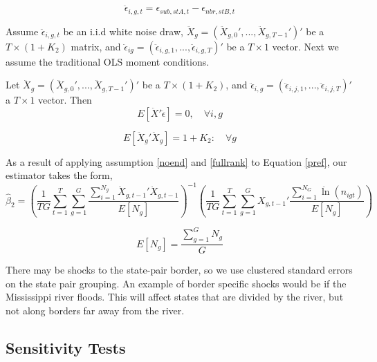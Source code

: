 \begin{equation}
\ddot \epsilon_{i,g,t} = \epsilon_{sub,stA,t}-\epsilon_{nbr,stB,t}
\end{equation}

Assume $\ddot \epsilon_{i,g,t}$ be an i.i.d white noise draw, $\ddot X_{g} = (\ddot X_{g,0}',...,\ddot X_{g,T-1}')'$ be a $T \times (1+K_{2})$ matrix, and $\ddot \epsilon_{ig} = (\ddot \epsilon_{i,g,1},...,\ddot \epsilon_{i,g,T})'$ be a $T \times 1$ vector. Next we assume the traditional OLS moment conditions.

\begin{assumption}\label{noend}
Let  $\ddot X_{g} = (\ddot X_{g,0}', ... ,\ddot X_{g,T-1}')'$ be a $T \times (1+K_{2})$, and $\ddot \epsilon_{i,g} = (\ddot\epsilon_{i,j,1},...,\ddot\epsilon_{i,j,T})'$ a $T \times 1$ vector. Then 
\begin{equation}E[\ddot X'\ddot \epsilon] = 0, \quad \forall i,g\end{equation}
\end{assumption}

\begin{assumption}\label{fullrank}
 \begin{equation}E[\ddot X_{g}'\ddot X_{g}] = 1+K_{2}: \quad \forall g\end{equation}
\end{assumption}

As a result of applying assumption \ref{noend} and \ref{fullrank} to Equation \ref{pref}, our estimator takes the form,
\begin{equation}\label{pols_2s}
\hat \beta_{2} = \left(\frac{1}{TG} \sum_{t=1}^{T}\sum_{g=1}^{G}\frac{\sum_{i=1}^{N_{g}}\ddot X_{g,t-1}'\ddot X_{g,t-1}}{E[N_{g}]}\right)^{-1}\left(\frac{1}{TG}\sum_{t=1}^{T}\sum_{g=1}^{G}X_{g,t-1}'\frac{\sum_{i=1}^{N_{G}}\ddot \ln(n_{igt})}{E[N_{g}]}\right)
\end{equation}

\begin{equation}
E[N_{g}] = \frac{\sum_{g=1}^{G}N_{g}}{G}
\end{equation}

There may be shocks to the state-pair border, so we use clustered standard errors on the state pair grouping. An example of border specific shocks would be if the Mississippi river floods. This will affect states that are divided by the river, but not along borders far away from the river.

\subsection{Sensitivity Tests}

